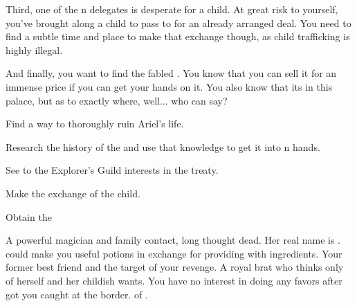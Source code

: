 \documentclass[char]{NeptuneBall}
\begin{document}
Third, one of the \pPacifica{}n delegates is desperate for a child. At great risk to yourself, you've brought along a child to pass to \cBodyguard{\them} for an already arranged deal. You need to find a subtle time and place to make that exchange though, as child trafficking is highly illegal.

And finally, you want to find the fabled \iGlowShell{\MYname}. You know that you can sell it for an immense price if you can get your hands on it. You also know that its in this palace, but as to exactly where, well... who can say?

\begin{itemz}[Goals]
  \item Find a way to thoroughly ruin Ariel's life.
	\item Research the history of the \pGazaStrip{} and use that knowledge to get it into \pAtlantis{}n hands.
	\item See to the Explorer's Guild interests in the treaty.
	\item Make the exchange of the child.
	\item Obtain the \iGlowShell{}
\end{itemz}

\begin{contacts}
  \contact{\cWitch{\MYname}} A powerful magician and family contact, long thought dead. Her real name is \cWitch{}. \cWitch{\They} could make you useful potions in exchange for providing \cWitch{\them} with ingredients.
  \contact{\cAriel{}} Your former best friend and the target of your revenge.
  \contact{\cPrincess{}} A royal brat who thinks only of herself and her childish wants. You have no interest in doing \cPrincess{\them} any favors after \cPrincess{\they} got you caught at the border.
  \contact{\cKing{}} \cKing{\King} of \pAtlantis{}. 
\end{contacts}
\end{document}
